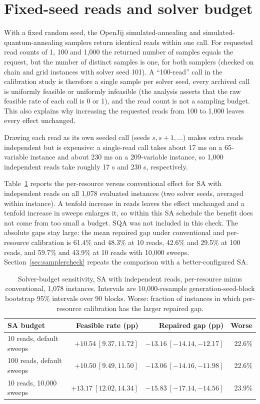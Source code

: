\documentclass[pdflatex,sn-nature]{sn-jnl}
\begin{document}
\section{Fixed-seed reads and solver budget}
With a fixed random seed, the OpenJij simulated-annealing and simulated-quantum-annealing samplers return identical reads within one call. For requested read counts of 1, 100 and 1,000 the returned number of samples equals the request, but the number of distinct samples is one, for both samplers (checked on chain and grid instances with solver seed 101). A ``100-read'' call in the calibration study is therefore a single sample per solver seed, every archived call is uniformly feasible or uniformly infeasible (the analysis asserts that the raw feasible rate of each call is 0 or 1), and the read count is not a sampling budget. This also explains why increasing the requested reads from 100 to 1,000 leaves every effect unchanged.

Drawing each read as its own seeded call (seeds $s,s+1,\ldots$) makes extra reads independent but is expensive: a single-read call takes about 17 ms on a 65-variable instance and about 230 ms on a 209-variable instance, so 1,000 independent reads take roughly 17 s and 230 s, respectively.

Table~\ref{tab:budget} reports the per-resource versus conventional effect for SA with independent reads on all 1,078 evaluated instances (two solver seeds, averaged within instance). A tenfold increase in reads leaves the effect unchanged and a tenfold increase in sweeps enlarges it, so within this SA schedule the benefit does not come from too small a budget. SQA was not included in this check. The absolute gaps stay large: the mean repaired gap under conventional and per-resource calibration is 61.4\% and 48.3\% at 10 reads, 42.6\% and 29.5\% at 100 reads, and 59.7\% and 43.9\% at 10 reads with 10,000 sweeps. Section~\ref{sec:samplercheck} repeats the comparison with a better-configured SA.

\begin{table}[h]
\caption{Solver-budget sensitivity, SA with independent reads, per-resource minus conventional, 1,078 instances. Intervals are 10,000-resample generation-seed-block bootstrap 95\% intervals over 90 blocks. Worse: fraction of instances in which per-resource calibration has the larger repaired gap.}\label{tab:budget}\centering\small
\begin{tabular}{@{}lrrr@{}}
\toprule
SA budget & Feasible rate (pp) & Repaired gap (pp) & Worse\\
\midrule
10 reads, default sweeps & $+10.54\ [9.37,11.72]$ & $-13.16\ [-14.14,-12.17]$ & 22.6\%\\
100 reads, default sweeps & $+10.50\ [9.49,11.50]$ & $-13.06\ [-14.16,-11.98]$ & 22.6\%\\
10 reads, 10{,}000 sweeps & $+13.17\ [12.02,14.34]$ & $-15.83\ [-17.14,-14.56]$ & 23.9\%\\
\bottomrule
\end{tabular}
\end{table}
\end{document}
